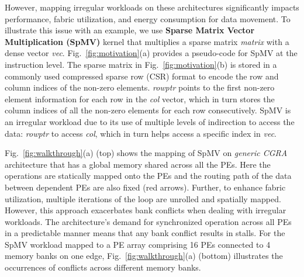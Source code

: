 However, mapping irregular workloads on these architectures significantly impacts performance, fabric utilization, and energy consumption for data movement.
To illustrate this issue with an example, we use \textbf{Sparse Matrix Vector Multiplication (SpMV)} kernel that multiplies a sparse matrix \textit{matrix} with a dense vector \textit{vec}. 
Fig.~\ref{fig:motivation}(a) provides a pseudo-code for SpMV at the instruction level. The sparse matrix in Fig.~\ref{fig:motivation}(b) is stored in a commonly used compressed sparse row (CSR) format to encode the row and column indices of the non-zero elements. \textit{rowptr} points to the first non-zero element information for each row in the \textit{col} vector, which in turn stores the column indices of all the non-zero elements for each row consecutively.
SpMV is an irregular workload due to its use of multiple levels of indirection to access the data: \textit{rowptr} to access \textit{col}, which in turn helps access a specific index in \textit{vec}.

Fig.~\ref{fig:walkthrough}(a) (top) shows the mapping of SpMV on \textit{generic CGRA} architecture that has a global memory shared across all the PEs. Here the operations are statically mapped onto the PEs and the routing path of the data between dependent PEs are also fixed (red arrows).
Further, to enhance fabric utilization, multiple iterations of the loop are unrolled and spatially mapped.
However, this approach exacerbates bank conflicts when dealing with irregular workloads. 
The architecture's demand for synchronized operation across all PEs in a predictable manner means that any bank conflict results in stalls.
For the SpMV workload mapped to a PE array comprising 16 PEs connected to 4 memory banks on one edge, Fig.~\ref{fig:walkthrough}(a) (bottom) illustrates the occurrences of conflicts across different memory banks.

